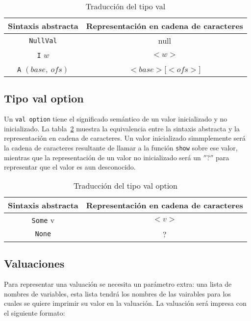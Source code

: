 \begin{table}[h!]
\centering
\begin{tabular}{|c|c|}
  \hline
  \textbf{Sintaxis abstracta} & \textbf{Representación en cadena de caracteres} \\ [0.5ex]
  \hline \hline
  \verb|NullVal| & null \\
  \verb|I| $w$ & $<w>$ \\
  \verb|A| $(base,\ ofs)$ & $<base>$[$<ofs>$] \\
  \hline
\end{tabular}

\caption{Traducción del tipo val}
\label{tab:pretty_val}
\end{table}

\subsection{Tipo val option}\label{subsection:pretty_val_option_type}

Un \verb|val option| tiene el significado semántico de un valor inicializado y no inicializado.
La tabla~\ref{tab:pretty_val_option} muestra la equivalencia entre la sintaxis abstracta y la representación en cadena de caracteres.
Un valor inicializado simmplemente será la cadena de caracteres resultante de llamar a la función \verb|show| sobre ese valor, mientras que la representación de un valor no inicializado será un $''?''$ para representar que el valor es aun desconocido.

\begin{table}[h!]
\centering
\begin{tabular}{|c|c|}
  \hline
  \textbf{Sintaxis abstracta} & \textbf{Representación en cadena de caracteres} \\ [0.5ex]
  \hline \hline
  \verb|Some| v & $<v>$ \\
  \verb|None| & ? \\
  \hline
\end{tabular}

\caption{Traducción del tipo val option}
\label{tab:pretty_val_option}
\end{table}


\subsection{Valuaciones}\label{subsection:pretty_valuations}

Para representar una valuación se necesita un parámetro extra: una lista de nombres de variables, esta lista tendrá los nombres de las vairables para los cuales se quiere imprimir su valor en la valuación.
La valuación será impresa con el siguiente formato:

